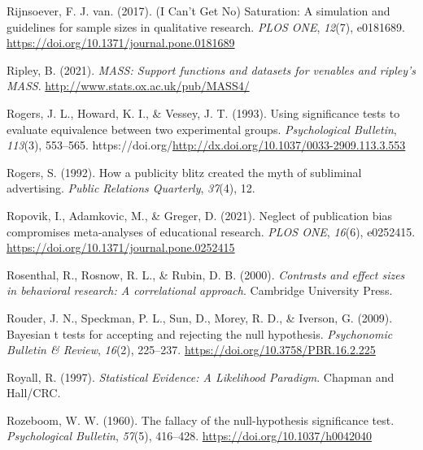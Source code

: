 \documentclass[
  oneside]{krantz}
\newlength{\cslhangindent}
\newlength{\cslentryspacingunit} %
\newenvironment{CSLReferences}[2] %
 {%
  \setlength{\parindent}{0pt}
  \ifodd #1
  \let\oldpar\par
  \def\par{\hangindent=\cslhangindent\oldpar}
  \fi
  \setlength{\parskip}{#2\cslentryspacingunit}
 }%
 {}
\begin{document}
\begin{CSLReferences}{1}{0}
\leavevmode{}%
Rijnsoever, F. J. van. (2017). ({I Can}'t {Get No}) {Saturation}: {A}
simulation and guidelines for sample sizes in qualitative research.
\emph{PLOS ONE}, \emph{12}(7), e0181689.
\url{https://doi.org/10.1371/journal.pone.0181689}

\leavevmode{}%
Ripley, B. (2021). \emph{MASS: Support functions and datasets for
venables and ripley's MASS}. \url{http://www.stats.ox.ac.uk/pub/MASS4/}

\leavevmode{}%
Rogers, J. L., Howard, K. I., \& Vessey, J. T. (1993). Using
significance tests to evaluate equivalence between two experimental
groups. \emph{Psychological Bulletin}, \emph{113}(3), 553--565.
https://doi.org/\url{http://dx.doi.org/10.1037/0033-2909.113.3.553}

\leavevmode{}%
Rogers, S. (1992). How a publicity blitz created the myth of subliminal
advertising. \emph{Public Relations Quarterly}, \emph{37}(4), 12.

\leavevmode{}%
Ropovik, I., Adamkovic, M., \& Greger, D. (2021). Neglect of publication
bias compromises meta-analyses of educational research. \emph{PLOS ONE},
\emph{16}(6), e0252415.
\url{https://doi.org/10.1371/journal.pone.0252415}

\leavevmode{}%
Rosenthal, R., Rosnow, R. L., \& Rubin, D. B. (2000). \emph{Contrasts
and effect sizes in behavioral research: A correlational approach}.
{Cambridge University Press}.

\leavevmode{}%
Rouder, J. N., Speckman, P. L., Sun, D., Morey, R. D., \& Iverson, G.
(2009). Bayesian t tests for accepting and rejecting the null
hypothesis. \emph{Psychonomic Bulletin \& Review}, \emph{16}(2),
225--237. \url{https://doi.org/10.3758/PBR.16.2.225}

\leavevmode{}%
Royall, R. (1997). \emph{Statistical {Evidence}: {A Likelihood
Paradigm}}. {Chapman and Hall/CRC}.

\leavevmode{}%
Rozeboom, W. W. (1960). The fallacy of the null-hypothesis significance
test. \emph{Psychological Bulletin}, \emph{57}(5), 416--428.
\url{https://doi.org/10.1037/h0042040}


\end{CSLReferences}
\end{document}

